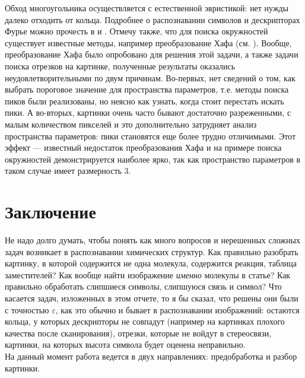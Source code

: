 \noindent
Обход многоугольника осуществляется с естественной эвристикой: нет нужды далеко отходить от кольца. 
Подробнее о распознавании символов
и дескрипторах Фурье можно прочесть в \cite{smolov} и \cite{zahn}. Отмечу также, что для поиска окружностей существует известные методы, 
например преобразование Хафа (см. \cite{gonzalez}). Вообще, преобразование Хафа было опробовано для решения этой задачи, а также задачи
поиска отрезков на картинке, полученные результаты оказались неудовлетворительными по двум причинам. Во-первых, нет сведений о том, как выбрать
пороговое значение для пространства параметров, т.е. методы поиска пиков были реализованы, но неясно как узнать, когда стоит перестать искать пики.
А во-вторых, картинки очень часто бывают достаточно разреженными, с малым количеством пикселей и это дополнительно затрудняет анализ пространства
параметров: пики становятся еще более трудно отличимыми. Этот эффект --- известный недостаток преобразования Хафа и на примере поиска окружностей
демонстрируется наиболее ярко, так как пространство параметров в таком случае имеет размерность 3.

\section{Заключение}
\label{sec:future}

Не надо долго думать, чтобы понять как много вопросов и нерешенных сложных задач возникает в распознавании химических структур. Как
правильно разобрать картинку, в которой содержится не одна молекула, содержится реакция, таблица заместителей? Как вообще
найти изображение \emph{именно} молекулы в статье? Как правильно обработать слипшиеся символы, слипшуюся связь и символ? Что касается задач, изложенных
в этом отчете, то я бы сказал, что решены они были с точностью $\varepsilon$, как это обычно и бывает в распознавании изображений: остаются
кольца, у которых дескрипторы не совпадут (например на картинках плохого качества после сканирования), отрезки, которые не войдут в стереосвязи, 
картинки, на которых высота символа будет оценена неправильно. \\

\noindent
На данный момент работа ведется в двух направлениях: предобработка и разбор картинки. \\ 

